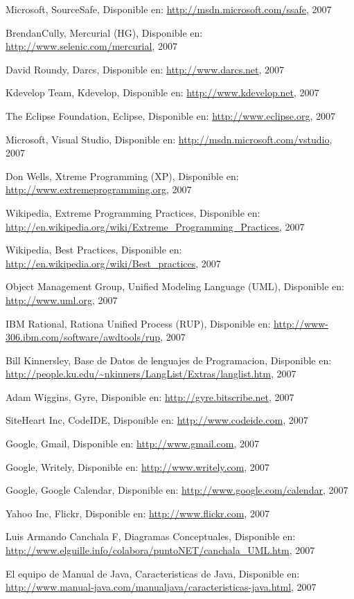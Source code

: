 \begin{thebibliography}{99}
 Microsoft, SourceSafe, Disponible en:
	\url{http://msdn.microsoft.com/ssafe}, 2007

 BrendanCully, Mercurial (HG), Disponible en:
	\url{http://www.selenic.com/mercurial}, 2007

 David Roundy, Darcs, Disponible en:
	\url{http://www.darcs.net}, 2007

 Kdevelop Team, Kdevelop, Disponible en:
	\url{http://www.kdevelop.net}, 2007

 The Eclipse Foundation, Eclipse, Disponible en:
	\url{http://www.eclipse.org}, 2007

 Microsoft, Visual Studio, Disponible en:
	\url{http://msdn.microsoft.com/vstudio}, 2007

 Don Wells, Xtreme Programming (XP), Disponible en:
	\url{http://www.extremeprogramming.org}, 2007

 Wikipedia, Extreme Programming Practices, Disponible en:
	\url{http://en.wikipedia.org/wiki/Extreme_Programming_Practices}, 2007

 Wikipedia, Best Practices, Disponible en:
	\url{http://en.wikipedia.org/wiki/Best_practices}, 2007

 Object Management Group, Unified Modeling Language (UML), Disponible en:
	\url{http://www.uml.org}, 2007

 IBM Rational, Rationa Unified Process (RUP), Disponible en:
	\url{http://www-306.ibm.com/software/awdtools/rup}, 2007

 Bill Kinnersley, Base de Datos de lenguajes de Programacion, Disponible en:
	\url{http://people.ku.edu/~nkinners/LangList/Extras/langlist.htm}, 2007

 Adam Wiggins, Gyre, Disponible en:
	\url{http://gyre.bitscribe.net}, 2007

 SiteHeart Inc, CodeIDE, Disponible en:
	\url{http://www.codeide.com}, 2007

 Google, Gmail, Disponible en:
	\url{http://www.gmail.com}, 2007

 Google, Writely, Disponible en:
	\url{http://www.writely.com}, 2007

 Google, Google Calendar, Disponible en:
	\url{http://www.google.com/calendar}, 2007

 Yahoo Inc, Flickr, Disponible en:
	\url{http://www.flickr.com}, 2007

 Luis Armando Canchala F, Diagramas Conceptuales, Disponible en:
	\url{http://www.elguille.info/colabora/puntoNET/canchala_UML.htm}, 2007


 El equipo de Manual de Java, Caracteristicas de Java, Disponible en:
	\url{http://www.manual-java.com/manualjava/caracteristicas-java.html}, 2007

\end{thebibliography}
